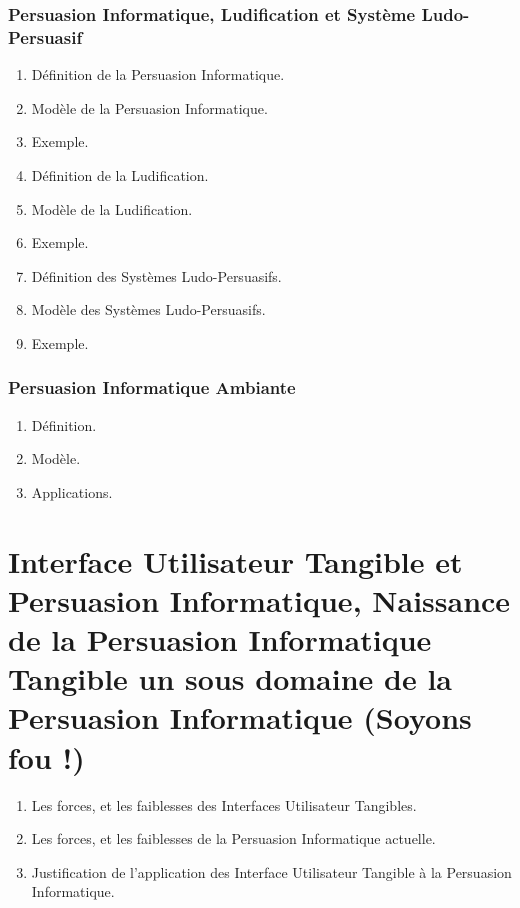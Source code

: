 \documentclass[]{pandoc/sigchi}
\begin{document}
\subsubsection{Persuasion Informatique, Ludification et Système
Ludo-Persuasif}\label{persuasion-informatique-ludification-et-systuxe8me-ludo-persuasif}

\begin{enumerate}
\def\labelenumi{\arabic{enumi}.}
\itemsep1pt\parskip0pt
\item
  Définition de la Persuasion Informatique.
\item
  Modèle de la Persuasion Informatique.
\item
  Exemple.
\item
  Définition de la Ludification.
\item
  Modèle de la Ludification.
\item
  Exemple.
\item
  Définition des Systèmes Ludo-Persuasifs.
\item
  Modèle des Systèmes Ludo-Persuasifs.
\item
  Exemple.
\end{enumerate}

\subsubsection{Persuasion Informatique
Ambiante}\label{persuasion-informatique-ambiante}

\begin{enumerate}
\def\labelenumi{\arabic{enumi}.}
\itemsep1pt\parskip0pt
\item
  Définition.
\item
  Modèle.
\item
  Applications.
\end{enumerate}

\section{Interface Utilisateur Tangible et Persuasion Informatique,
Naissance de la Persuasion Informatique Tangible un sous domaine de la
Persuasion Informatique (Soyons fou
!)}\label{interface-utilisateur-tangible-et-persuasion-informatique-naissance-de-la-persuasion-informatique-tangible-un-sous-domaine-de-la-persuasion-informatique-soyons-fou}

\begin{enumerate}
\def\labelenumi{\arabic{enumi}.}
\itemsep1pt\parskip0pt
\item
  Les forces, et les faiblesses des Interfaces Utilisateur Tangibles.
\item
  Les forces, et les faiblesses de la Persuasion Informatique actuelle.
\item
  Justification de l'application des Interface Utilisateur Tangible à la
  Persuasion Informatique.
\end{enumerate}
\end{document}
